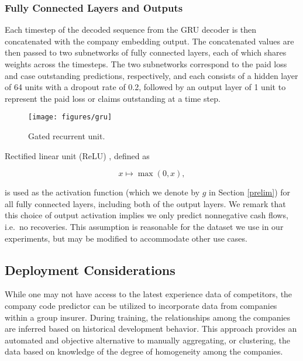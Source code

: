 \documentclass[risks,article,submit,moreauthors,pdftex]{mdpi}
\begin{document}
\hypertarget{fully-connected-layers-and-outputs}{%
\subsubsection{Fully Connected Layers and Outputs}\label{fully-connected-layers-and-outputs}}

Each timestep of the decoded sequence from the GRU decoder is then concatenated with the company embedding output. The concatenated values are then passed to two subnetworks of fully connected layers, each of which shares weights across the timesteps. The two subnetworks correspond to the paid loss and case outstanding predictions, respectively, and each consists of a hidden layer of 64 units with a dropout rate of 0.2, followed by an output layer of 1 unit to represent the paid loss or claims outstanding at a time step.

\begin{figure}[h]

{\centering \texttt{[image: figures/gru]} 

}

\caption{Gated recurrent unit.}\label{fig:gru}
\end{figure}

Rectified linear unit (ReLU) \citep{nair2010rectified}, defined as

\begin{equation}
x \mapsto \max(0, x),
\end{equation}

is used as the activation function (which we denote by \(g\) in Section \ref{prelim}) for all fully connected layers, including both of the output layers. We remark that this choice of output activation implies we only predict nonnegative cash flows, i.e.~no recoveries. This assumption is reasonable for the dataset we use in our experiments, but may be modified to accommodate other use cases.

\hypertarget{deployment-considerations}{%
\subsection{Deployment Considerations}\label{deployment-considerations}}

While one may not have access to the latest experience data of competitors, the company code predictor can be utilized to incorporate data from companies within a group insurer. During training, the relationships among the companies are inferred based on historical development behavior. This approach provides an automated and objective alternative to manually aggregating, or clustering, the data based on knowledge of the degree of homogeneity among the companies.
\end{document}
